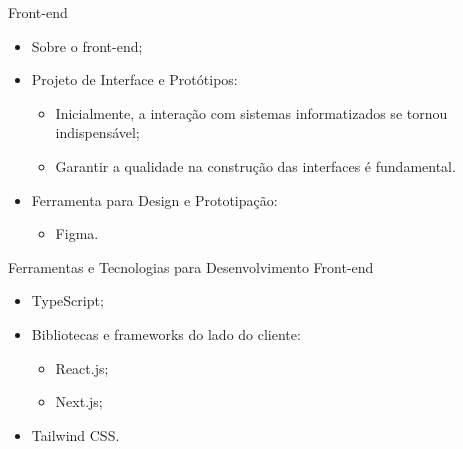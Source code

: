 \begin{frame}{Front-end}
    \begin{itemize}
        \item Sobre o front-end; \vspace{0.5cm}
        \item Projeto de Interface e Protótipos: \vspace{0.5cm}
              \begin{itemize}
                  \item Inicialmente, a interação com sistemas informatizados se tornou indispensável; \vspace{0.25cm}
                  \item Garantir a qualidade na construção das interfaces é fundamental. \vspace{0.25cm}
              \end{itemize}
        \item Ferramenta para Design e Prototipação: \vspace{0.5cm}
              \begin{itemize}
                  \item Figma. \vspace{0.25cm}
              \end{itemize}
    \end{itemize}
\end{frame}

\begin{frame}{Ferramentas e Tecnologias para Desenvolvimento Front-end}
    \begin{itemize}
        \item TypeScript; \vspace{0.5cm}
        \item Bibliotecas e frameworks do lado do cliente: \vspace{0.5cm}
        \begin{itemize}
            \item React.js; \vspace{0.5cm}
            \item Next.js; \vspace{0.5cm}
        \end{itemize}
        \item Tailwind CSS. \vspace{0.5cm}
    \end{itemize}
\end{frame}

